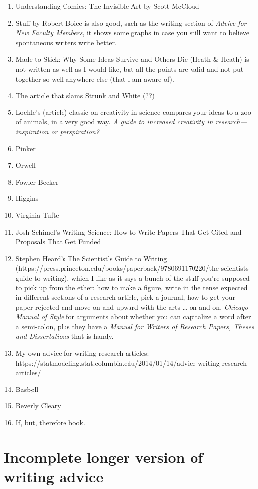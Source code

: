 \documentclass[11pt,letter]{article}
\begin{document}
\begin{enumerate}
\item Understanding Comics: The Invisible Art by Scott McCloud 
\item  Stuff by Robert Boice is also good, such as the writing section of \emph{Advice for New Faculty Members}, it shows some graphs in case you still want to believe spontaneous writers write better.
\item Made to Stick: Why Some Ideas Survive and Others Die (Heath \& Heath) is not written as well as I would like, but all the points are valid and not put together so well anywhere else (that I am aware of).
\item The article that slams Strunk and White (??)
\item Loehle's (article) classic on creativity in science compares your ideas to a zoo of animals, in a very good way. \emph{A guide to increased creativity in research---inspiration or perspiration?}
\item Pinker
\item Orwell
\item Fowler
\tem Becker
\item Higgins
\item Virginia Tufte 
\item Josh Schimel's Writing Science: How to Write Papers That Get Cited and Proposals That Get Funded
\item Stephen Heard’s The Scientist’s Guide to Writing (https://press.princeton.edu/books/paperback/9780691170220/the-scientists-guide-to-writing), which I like as it says a bunch of the stuff you’re supposed to pick up from the ether: how to make a figure, write in the tense expected in different sections of a research article, pick a journal, how to get your paper rejected and move on and upward with the arts … on and on. 
\emph{Chicago Manual of Style} for arguments about whether you can capitalize a word after a semi-colon, plus they have a \emph{Manual for Writers of Research Papers, Theses and Dissertations} that is handy.
\item My own advice for writing research articles:  https://statmodeling.stat.columbia.edu/2014/01/14/advice-writing-research-articles/
\item Basbøll 
\item Beverly Cleary 
\item If, but, therefore book. 
\end{enumerate}



\section{Incomplete longer version of writing advice}
\end{document}
